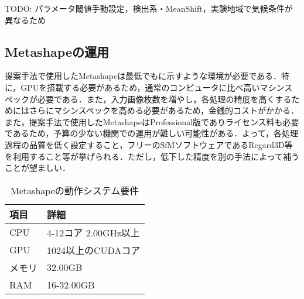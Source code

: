     TODO: パラメータ閾値手動設定，検出系・MeanShift，実験地域で気候条件が異なるため


    \subsection*{Metashapeの運用}
      提案手法で使用したMetashapeは最低でもに示すような環境が必要である．特に，GPUを搭載する必要があるため，通常のコンピュータに比べ高いマシンスペックが必要である．また，入力画像枚数を増やし，各処理の精度を高くするためにはさらにマシンスペックを高める必要があるため，金銭的コストがかかる．また，提案手法で使用したMetashapeはProfessional版でありライセンス料も必要であるため，予算の少ない機関での運用が難しい可能性がある．よって，各処理過程の品質を低く設定すること，フリーのSfMソフトウェアであるRegard3D\cite{Regard3D}等を利用すること等が挙げられる．ただし，低下した精度を別の手法によって補うことが望ましい．
      
      \begin{table}[tbp]
        \centering
        \caption{Metashapeの動作システム要件}
        \label{Metashapeの動作システム要件}
        \begin{tabular}{ll}
          \hline
          \textbf{項目} & \textbf{詳細} \\
          \hline \hline
          CPU & 4-12コア 2.00GHz以上 \\
          GPU & 1024以上のCUDAコア \\
          メモリ & 32.00GB \\
          RAM & 16-32.00GB \\ \hline
        \end{tabular}
      \end{table}
